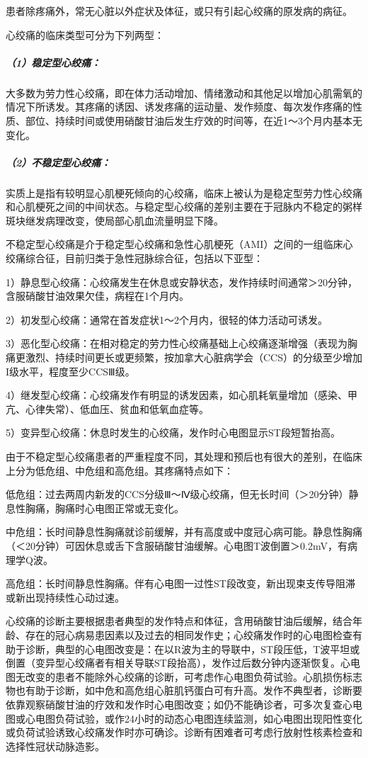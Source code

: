 患者除疼痛外，常无心脏以外症状及体征，或只有引起心绞痛的原发病的病征。

心绞痛的临床类型可分为下列两型：

\subparagraph{（1）稳定型心绞痛：}

大多数为劳力性心绞痛，即在体力活动增加、情绪激动和其他足以增加心肌需氧的情况下所诱发。其疼痛的诱因、诱发疼痛的运动量、发作频度、每次发作疼痛的性质、部位、持续时间或使用硝酸甘油后发生疗效的时间等，在近1～3个月内基本无变化。

\subparagraph{（2）不稳定型心绞痛：}

实质上是指有较明显心肌梗死倾向的心绞痛，临床上被认为是稳定型劳力性心绞痛和心肌梗死之间的中间状态。与稳定型心绞痛的差别主要在于冠脉内不稳定的粥样斑块继发病理改变，使局部心肌血流量明显下降。

不稳定型心绞痛是介于稳定型心绞痛和急性心肌梗死（AMI）之间的一组临床心绞痛综合征，目前归类于急性冠脉综合征，包括以下亚型：

1）静息型心绞痛：心绞痛发生在休息或安静状态，发作持续时间通常＞20分钟，含服硝酸甘油效果欠佳，病程在1个月内。

2）初发型心绞痛：通常在首发症状1～2个月内，很轻的体力活动可诱发。

3）恶化型心绞痛：在相对稳定的劳力性心绞痛基础上心绞痛逐渐增强（表现为胸痛更激烈、持续时间更长或更频繁，按加拿大心脏病学会（CCS）的分级至少增加I级水平，程度至少CCSⅢ级。

4）继发型心绞痛：心绞痛发作有明显的诱发因素，如心肌耗氧量增加（感染、甲亢、心律失常）、低血压、贫血和低氧血症等。

5）变异型心绞痛：休息时发生的心绞痛，发作时心电图显示ST段短暂抬高。

由于不稳定型心绞痛患者的严重程度不同，其处理和预后也有很大的差别，在临床上分为低危组、中危组和高危组。其疼痛特点如下：

低危组：过去两周内新发的CCS分级Ⅲ～Ⅳ级心绞痛，但无长时间（＞20分钟）静息性胸痛，胸痛时心电图正常或无变化。

中危组：长时间静息性胸痛就诊前缓解，并有高度或中度冠心病可能。静息性胸痛（＜20分钟）可因休息或舌下含服硝酸甘油缓解。心电图T波倒置＞0.2mV，有病理学Q波。

高危组：长时间静息性胸痛。伴有心电图一过性ST段改变，新出现束支传导阻滞或新出现持续性心动过速。

心绞痛的诊断主要根据患者典型的发作特点和体征，含用硝酸甘油后缓解，结合年龄、存在的冠心病易患因素以及过去的相同发作史；心绞痛发作时的心电图检查有助于诊断，典型的心电图改变是：在以R波为主的导联中，ST段压低，T波平坦或倒置（变异型心绞痛者有相关导联ST段抬高），发作过后数分钟内逐渐恢复。心电图无改变的患者不能除外心绞痛的诊断，可考虑作心电图负荷试验。心肌损伤标志物也有助于诊断，如中危和高危组心脏肌钙蛋白可有升高。发作不典型者，诊断要依靠观察硝酸甘油的疗效和发作时心电图改变；如仍不能确诊者，可多次复查心电图或心电图负荷试验，或作24小时的动态心电图连续监测，如心电图出现阳性变化或负荷试验诱致心绞痛发作时亦可确诊。诊断有困难者可考虑行放射性核素检查和选择性冠状动脉造影。

